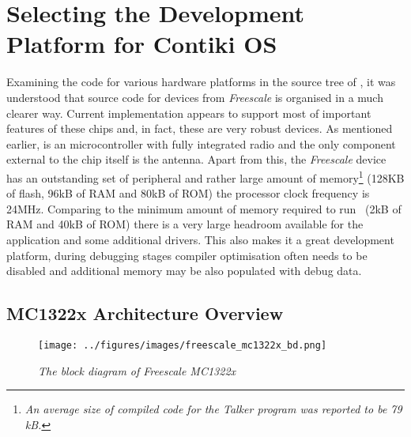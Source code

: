 \section{Selecting the Development \\Platform for Contiki OS} \label{sec:MCX}

  Examining the code for various hardware platforms in the source
 tree of \Contiki, it was understood that source code for
  devices from \emph{Freescale} is organised in a
 much clearer way. Current implementation appears to support most
 of important features of these chips and, in fact, these are
 very robust devices. As mentioned earlier,  is an
  microcontroller with fully integrated radio and
 the only component external to the chip itself is the antenna.
 Apart from this, the \emph{Freescale} device has an outstanding
 set of peripheral and rather large amount of memory\footnote{\emph{%
 An average size of compiled code for the Talker program was
 reported to be 79 kB.}} (128KB of flash, 96kB of RAM and 80kB
 of ROM) the processor clock frequency is 24MHz. Comparing to
 the minimum amount of memory required to run \Contiki\ (2kB of RAM
 and 40kB of ROM) there is a very large headroom available for the
 application and some additional drivers. This also makes it a great
 development platform, during debugging stages compiler optimisation
 often needs to be disabled and additional memory may be also
 populated with debug data.

\subsection{MC1322x Architecture Overview}


\begin{figure}
\centering
\texttt{[image: ../figures/images/freescale\_mc1322x\_bd.png]}
\caption{\emph{The block diagram of Freescale MC1322x}} \label{fig:mc1322x}
\end{figure}

